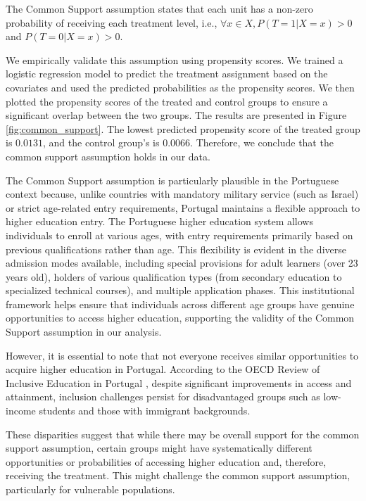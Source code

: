 \documentclass{article}
\begin{document}
The Common Support assumption states that each unit has a non-zero probability of receiving each treatment level, i.e., $\forall x \in X, P(T=1|X=x) > 0$ and $P(T=0|X=x) > 0$.

We empirically validate this assumption using propensity scores. We trained a logistic regression model to predict the treatment assignment based on the covariates and used the predicted probabilities as the propensity scores. We then plotted the propensity scores of the treated and control groups to ensure a significant overlap between the two groups. The results are presented in Figure \ref{fig:common_support}. The lowest predicted propensity score of the treated group is $0.0131$, and the control group's is $0.0066$. Therefore, we conclude that the common support assumption holds in our data.

The Common Support assumption is particularly plausible in the Portuguese context because, unlike countries with mandatory military service (such as Israel) or strict age-related entry requirements, Portugal maintains a flexible approach to higher education entry. The Portuguese higher education system allows individuals to enroll at various ages, with entry requirements primarily based on previous qualifications rather than age. This flexibility is evident in the diverse admission modes available, including special provisions for adult learners (over 23 years old), holders of various qualification types (from secondary education to specialized technical courses), and multiple application phases. This institutional framework helps ensure that individuals across different age groups have genuine opportunities to access higher education, supporting the validity of the Common Support assumption in our analysis.

However, it is essential to note that not everyone receives similar opportunities to acquire higher education in Portugal. According to the OECD Review of Inclusive Education in Portugal \citep{/content/publication/a9c95902-en}, despite significant improvements in access and attainment, inclusion challenges persist for disadvantaged groups such as low-income students and those with immigrant backgrounds. 

These disparities suggest that while there may be overall support for the common support assumption, certain groups might have systematically different opportunities or probabilities of accessing higher education and, therefore, receiving the treatment. This might challenge the common support assumption, particularly for vulnerable populations.
\end{document}
